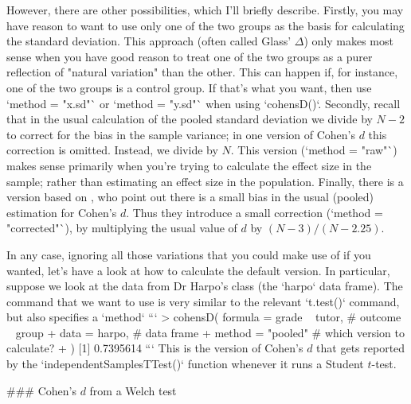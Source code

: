 However, there are other possibilities, which I'll briefly describe. Firstly, you may have reason to want to use only one of the two groups as the basis for calculating the standard deviation. This approach (often called Glass' $\Delta$) only makes most sense when you have good reason to treat one of the two groups as a purer reflection of "natural variation" than the other. This can happen if, for instance, one of the two groups is a control group. If that's what you want, then use `method = "x.sd"` or `method = "y.sd"` when using `cohensD()`. Secondly, recall that in the usual calculation of the pooled standard deviation we divide by $N-2$ to correct for the bias in the sample variance; in one version of Cohen's $d$ this correction is omitted. Instead, we divide by $N$. This version (`method = "raw"`) makes sense primarily when you're trying to calculate the effect size in the sample; rather than estimating an effect size in the population. Finally, there is a version based on , who point out there is a small bias in the usual (pooled) estimation for Cohen's $d$. Thus they introduce a small correction (`method = "corrected"`), by multiplying the usual value of $d$ by $(N-3)/(N-2.25)$. 

In any case, ignoring all those variations that you could make use of if you wanted, let's have a look at how to calculate the default version. In particular, suppose we look at the data from Dr Harpo's class (the `harpo` data frame). The command that we want to use is very similar to the relevant `t.test()` command, but also specifies a `method`
```
> cohensD( formula = grade ~ tutor,  # outcome ~ group
+          data = harpo,             # data frame 
+          method = "pooled"         # which version to calculate?
+ )
[1] 0.7395614
```
This is the version of Cohen's $d$ that gets reported by the `independentSamplesTTest()` function whenever it runs a Student $t$-test.

### Cohen's $d$ from a Welch test


